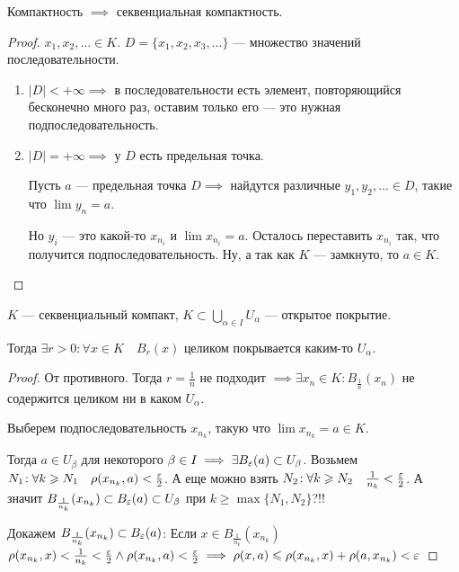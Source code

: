 \begin{consequence}
    Компактность $\implies$ секвенциальная компактность. 
\end{consequence}
\begin{proof}
    $x_1, x_2, \ldots \in K$. $D = \{ x_1, x_2, x_3,\ldots\}$ --- множество значений последовательности. 

    \begin{enumerate}
        \item $|D| < +\infty \implies$ в последовательности есть элемент, повторяющийся бесконечно много раз, оставим только его --- это нужная подпоследовательность.
        \item $|D| = +\infty \implies$ у  $D$ есть предельная точка.

            Пусть  $a$ --- предельная точка  $D \implies$ найдутся различные $y_1, y_2, \ldots \in D$, такие что $\lim y_n = a$. 

            Но $y_i$ --- это какой-то  $x_{n_i}$ и $\lim x_{n_i} = a$. Осталось переставить  $x_{n_i}$ так, что получится подпоследовательность. Ну, а так как  $K$ --- замкнуто, то  $a \in K$.
    \end{enumerate}
\end{proof}
\begin{lemma}
    $K$ --- секвенциальный компакт,  $K \subset \bigcup\limits_{\alpha \in I} U_\alpha$ --- открытое покрытие.

    Тогда  $\exists r > 0\!: \forall x \in K\quad B_r(x)$ целиком покрывается каким-то  $U_\alpha$.
\end{lemma}
\begin{proof}
    От противного. Тогда $r = \frac{1}{n}$ не подходит $\implies \exists x_n \in K\!: B_{\frac{1}{n}}(x_n)$ не содержится целиком ни в каком $U_\alpha$.

    Выберем подпоследовательность $x_{n_k}$, такую что  $\lim x_{n_k} = a \in K$.

    Тогда  $a \in U_\beta$ для некоторого  $\beta \in I \implies \exists B_\varepsilon(a) \subset U_\beta$. Возьмем  $N_1\!: \forall k \geqslant N_1\quad \rho(x_{n_k}, a) < \frac{\varepsilon}{2}$. А еще можно взять $N_2\!: \forall k \geqslant N_2\quad \frac{1}{n_k} < \frac{\varepsilon}{2}$. А значит $B_{\frac{1}{n_{k}}}(x_{n_k}) \subset B_\varepsilon(a) \subset U_\beta$ при $k \ge \max\{N_1, N_2\}$?!!

    Докажем $B_{\frac{1}{n_{k}}}(x_{n_k}) \subset B_\varepsilon(a)$: Если $x \in B_{\frac{1}{n_k}}(x_{n_k})$  $\rho(x_{n_k}, x) < \frac{1}{n_k} < \frac{\varepsilon}{2} \land \rho(x_{n_k}, a) < \frac{\varepsilon}{2} \implies \rho(x, a) \leqslant \rho(x_{n_k}, x) + \rho(a, x_{n_k}) < \varepsilon$ 
\end{proof}
